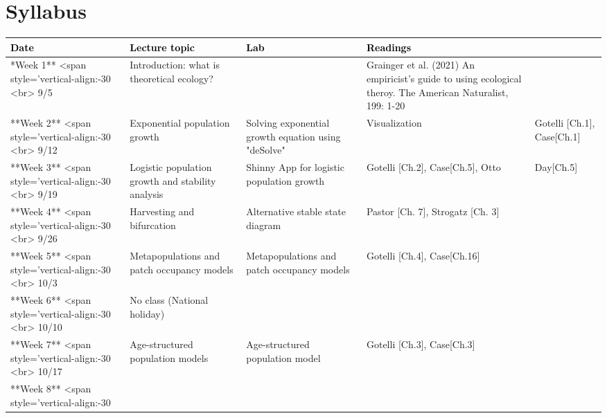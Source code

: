 \documentclass[
]{book}
\begin{document}
\hypertarget{syllabus}{%
\chapter*{Syllabus}\label{syllabus}}

\begingroup\fontsize{17}{19}\selectfont

\begin{tabu} to 
\hline
\begingroup\fontsize{20}{22}\selectfont \textcolor{black}{\textbf{Date}}\endgroup & \begingroup\fontsize{20}{22}\selectfont \textcolor{black}{\textbf{Lecture topic}}\endgroup & \begingroup\fontsize{20}{22}\selectfont \textcolor{black}{\textbf{Lab}}\endgroup & \begingroup\fontsize{20}{22}\selectfont \textcolor{black}{\textbf{Readings}}\endgroup\\
\hline
**Week 1** <span style='vertical-align:-30%
           <br> 9/5 & Introduction: what is theoretical ecology? & \- & Grainger et al. (2021) An empiricist's guide to using ecological theroy. The American Naturalist, 199: 1-20\\
\hline
**Week 2** <span style='vertical-align:-30%
           <br> 9/12 & Exponential population growth & Solving exponential growth equation using "deSolve" & Visualization & Gotelli [Ch.1], Case[Ch.1]\\
\hline
**Week 3** <span style='vertical-align:-30%
           <br> 9/19 & Logistic population growth and stability analysis & Shinny App for logistic population growth & Gotelli [Ch.2], Case[Ch.5], Otto & Day[Ch.5]\\
\hline
**Week 4** <span style='vertical-align:-30%
           <br> 9/26 & Harvesting and bifurcation & Alternative stable state diagram & Pastor [Ch. 7], Strogatz [Ch. 3]\\
\hline
**Week 5** <span style='vertical-align:-30%
           <br> 10/3 & Metapopulations and patch occupancy models & Metapopulations and patch occupancy models & Gotelli [Ch.4], Case[Ch.16]\\
\hline
**Week 6** <span style='vertical-align:-30%
           <br> 10/10 & No class (National holiday) & \- & \-\\
\hline
**Week 7** <span style='vertical-align:-30%
           <br> 10/17 & Age-structured population models & Age-structured population model & Gotelli [Ch.3], Case[Ch.3]\\
\hline
**Week 8** <span style='vertical-align:-30%

\end{tabu}
\end{document}
